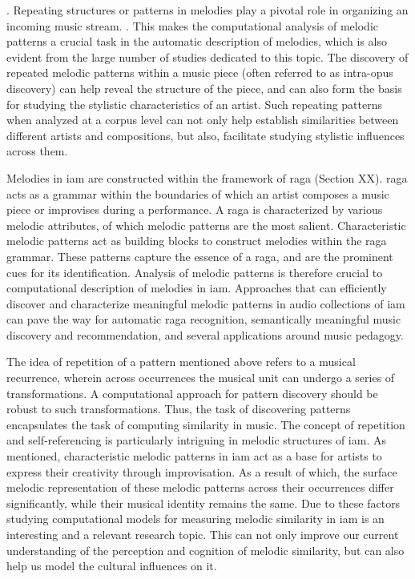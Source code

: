 . Repeating structures or patterns in melodies play a pivotal role in organizing an incoming music stream. . This makes the computational analysis of melodic patterns a crucial task in the automatic description of melodies, which is also evident from the large number of studies dedicated to this topic. The discovery of repeated melodic patterns within a music piece (often referred to as intra-opus discovery) can help reveal the structure of the piece, and can also form the basis for studying the stylistic characteristics of an artist. Such repeating patterns when analyzed at a corpus level can not only help establish similarities between different artists and compositions, but also, facilitate studying stylistic influences across them. 

Melodies in \gls{iam} are constructed within the framework of \gls{raga} (Section XX). \gls{raga} acts as a grammar within the boundaries of which an artist composes a music piece or improvises during a performance. A \gls{raga} is characterized by various melodic attributes, of which melodic patterns are the most salient. Characteristic melodic patterns act as building blocks to construct melodies within the \gls{raga} grammar. These patterns capture the essence of a \gls{raga}, and are the prominent cues for its identification. Analysis of melodic patterns is therefore crucial to computational description of melodies in \gls{iam}. Approaches that can efficiently discover and characterize meaningful melodic patterns in audio collections of \gls{iam} can pave the way for automatic \gls{raga} recognition, semantically meaningful music discovery and recommendation, and several applications around music pedagogy.

The idea of repetition of a pattern mentioned above refers to a musical recurrence, wherein across occurrences the musical unit can undergo a series of transformations. A computational approach for pattern discovery should be robust to such transformations. Thus, the task of discovering patterns encapsulates the task of computing similarity in music.  The concept of repetition and self-referencing is particularly intriguing in melodic structures of \gls{iam}. As mentioned, characteristic melodic patterns in \gls{iam} act as a base for artists to express their creativity through improvisation. As a result of which, the surface melodic representation of these melodic patterns across their occurrences differ significantly, while their musical identity remains the same. Due to these factors studying computational models for measuring melodic similarity in \gls{iam} is an interesting and a relevant research topic. This can not only improve our current understanding of the perception and cognition of melodic similarity, but can also help us model the cultural influences on it. 

